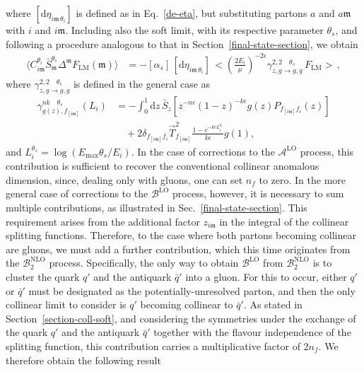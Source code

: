 \documentclass[a4paper, 12pt]{book}
\newcommand{\um}{\mathfrak{m}}
\begin{document}
where $[\mathrm{d}\eta_{i\um \, \theta_i}]$ is defined as in Eq.~\ref{de-eta}, but substituting partons $a$ and $a\um$ with $i$ and $i\um$. Including also the soft limit, with its respective parameter $\theta_s$, and following a procedure analogous to that in Section~\ref{final-state-section}, we obtain
\begin{equation}
  \begin{split}
  \langle C_{i\mathfrak{m}}^{\theta_i} \bar{S}_{\mathfrak{m}}^{\theta_s} \Delta^{\mathfrak{m}} F_{\mathrm{LM}}(\mathfrak{m})\rangle &= -[\alpha_s] \,[\mathrm{d}\eta_{i\um \, \theta_i}] \, \bigl< \left(\frac{2E_i}{\mu}\right)^{-2\epsilon} \gamma^{2,2 \quad \theta_s}_{z,g \to g, g} \, F_{\mathrm{LM}} \bigr> \, , 
  \label{coll-par-ggg}
  \end{split}
\end{equation}
where $\gamma^{2,2 \quad \theta_s}_{z,g \to g, g}$ is defined in the general case as
\begin{align}
  \gamma^{nk \quad \theta_s}_{g(z),f_{[i\um]}} (L_i) 
  &= - \int_0^1 \mathrm{d}z \, \bar{S}_z \left[z^{-n\epsilon}(1-z)^{-k\epsilon}g(z)P_{f_{[i\um]}f_i}(z)\right] \nonumber \\
  &\quad + 2 \delta_{f_{[i\um]}f_i} \vec{T}^2_{f_{[i\um]}} \frac{1-e^{-k \epsilon L_i^{\theta_s}}}{k\epsilon} g(1) ,
  \label{gen-an-dim-theta}
\end{align}
and $L_i^{\theta_s}=\log{\left(E_{\mathrm{max}}\theta_s/E_i\right)}$. In the case of corrections to the $\mathcal{A}^{\mathrm{LO}}$ process, this contribution is sufficient to recover the conventional collinear anomalous dimension, since, dealing only with gluons, one can set $n_f$ to zero. In the more general case of corrections to the $\mathcal{B}^{\mathrm{LO}}$ process, however, it is necessary to sum multiple contributions, as illustrated in Sec.~\ref{final-state-section}. This requirement arises from the additional factor $z_{i\um}$ in the integral of the collinear splitting functions. Therefore, to the case where both partons becoming collinear are gluons, we must add a further contribution, which this time originates from the $\mathcal{B}_2^{\mathrm{NLO}}$ process. Specifically, the only way to obtain $\mathcal{B}^{\mathrm{LO}}$ from $\mathcal{B}_2^{\mathrm{NLO}}$ is to cluster the quark $q'$ and the antiquark $\bar{q}'$ into a gluon. For this to occur, either $q'$ or $\bar{q}'$ must be designated as the potentially-unresolved parton, and then the only collinear limit to consider is $q'$ becoming collinear to $\bar{q}'$. As stated in Section~\ref{section-coll-soft}, and considering the symmetries under the exchange of the quark $q'$ and the antiquark $\bar{q}'$ together with the flavour independence of the splitting function, this contribution carries a multiplicative factor of $2n_f$. We therefore obtain the following result
\end{document}
